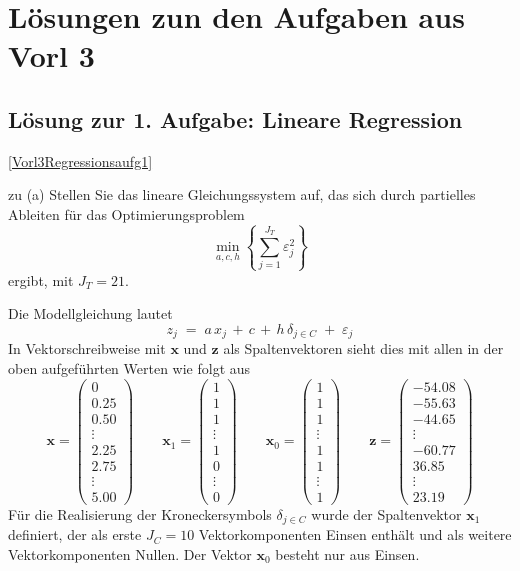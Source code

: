 \section{Lösungen zun den Aufgaben aus Vorl 3}
\subsection{Lösung zur 1. Aufgabe: Lineare Regression}
\ref{Vorl3Regressionsaufg1}

zu (a) Stellen Sie das lineare Gleichungssystem auf, das sich durch partielles Ableiten
für das Optimierungsproblem
$$
\min\limits_{a,c,h} \left\{\sum_{j=1}^{J_T} \varepsilon_j^2\right\}
$$
ergibt, mit $J_T = 21$.

Die Modellgleichung lautet
\begin{equation}
z_j \; = \; a \, x_j \, + \, c \, + \, h \, \delta_{j \in C} \; + \; \varepsilon_j
\label{Modellgl1}
\end{equation}
In Vektorschreibweise mit $\boldsymbol x$ und $\boldsymbol z$ als Spaltenvektoren sieht 
dies mit allen in der oben aufgeführten Werten wie folgt aus
$$
\boldsymbol x = \left(
\begin{array}{c}
0\\
0.25\\
0.50\\
\vdots\\
2.25\\
2.75\\
\vdots\\
5.00
\end{array}\right) \qquad
\boldsymbol x_1 = \left(
\begin{array}{c}
1\\
1\\
1\\
\vdots\\
1\\
0\\
\vdots\\
0
\end{array}\right)  \qquad
\boldsymbol x_0 = \left(
\begin{array}{c}
1\\
1\\
1\\
\vdots\\
1\\
1\\
\vdots\\
1
\end{array}\right) \qquad
\boldsymbol z = \left(
\begin{array}{c}
-54.08\\
-55.63\\
-44.65\\
\vdots\\
-60.77\\
36.85\\
\vdots\\
23.19
\end{array}\right)
$$
Für die Realisierung der Kroneckersymbols $\delta_{j \in C}$ wurde
der Spaltenvektor $\boldsymbol x_1$ definiert, der als erste
$J_C = 10$ Vektorkomponenten Einsen enthält und als weitere Vektorkomponenten Nullen.
Der Vektor $\boldsymbol x_0$ besteht nur aus Einsen.

